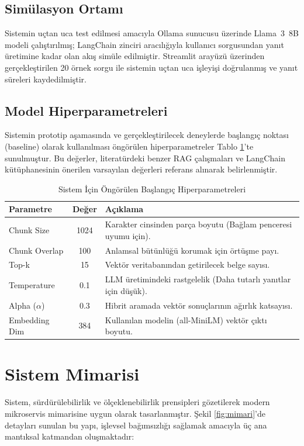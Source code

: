 \documentclass[12pt,a4paper]{report}
\begin{document}
\subsection{Simülasyon Ortamı}
Sistemin uçtan uca test edilmesi amacıyla Ollama sunucusu üzerinde Llama~3~8B modeli çalıştırılmış; LangChain zinciri aracılığıyla kullanıcı sorgusundan yanıt üretimine kadar olan akış simüle edilmiştir. Streamlit arayüzü üzerinden gerçekleştirilen 20 örnek sorgu ile sistemin uçtan uca işleyişi doğrulanmış ve yanıt süreleri kaydedilmiştir.

\subsection{Model Hiperparametreleri}
Sistemin prototip aşamasında ve gerçekleştirilecek deneylerde başlangıç noktası (baseline) olarak kullanılması öngörülen hiperparametreler Tablo \ref{tab:hyperparams}'te sunulmuştur. Bu değerler, literatürdeki benzer RAG çalışmaları ve LangChain kütüphanesinin önerilen varsayılan değerleri referans alınarak belirlenmiştir.

\begin{table}[H]
  \centering
  \caption{Sistem İçin Öngörülen Başlangıç Hiperparametreleri}
  \begin{tabular}{|l|c|l|}
    \hline
    \textbf{Parametre} & \textbf{Değer} & \textbf{Açıklama} \\
    \hline
    Chunk Size & 1024 & Karakter cinsinden parça boyutu (Bağlam penceresi uyumu için). \\
    Chunk Overlap & 100 & Anlamsal bütünlüğü korumak için örtüşme payı. \\
    Top-k & 15 & Vektör veritabanından getirilecek belge sayısı. \\
    Temperature & 0.1 & LLM üretimindeki rastgelelik (Daha tutarlı yanıtlar için düşük). \\
    Alpha ($\alpha$) & 0.3 & Hibrit aramada vektör sonuçlarının ağırlık katsayısı. \\
    Embedding Dim & 384 & Kullanılan modelin (all-MiniLM) vektör çıktı boyutu. \\
    \hline
  \end{tabular}
  \label{tab:hyperparams}
\end{table}

\newpage
\section{Sistem Mimarisi}
Sistem, sürdürülebilirlik ve ölçeklenebilirlik prensipleri gözetilerek modern mikroservis mimarisine uygun olarak tasarlanmıştır. Şekil \ref{fig:mimari}'de detayları sunulan bu yapı, işlevsel bağımsızlığı sağlamak amacıyla üç ana mantıksal katmandan oluşmaktadır:
\end{document}
